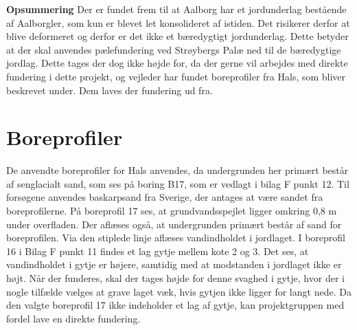 \newline
\newline
\textbf{Opsummering}
\newline
Der er fundet frem til at Aalborg har et jordunderlag bestående af Aalborgler, som kun er blevet let konsolideret af istiden. Det risikerer derfor at  blive deformeret og derfor er det ikke et bæredygtigt jordunderlag. Dette betyder at der skal anvendes pælefundering ved Strøybergs Palæ ned til de bæredygtige jordlag. Dette tages der dog ikke højde for, da der gerne vil arbejdes med direkte fundering i dette projekt, og vejleder har fundet boreprofiler fra Hals, som bliver beskrevet under. Dem laves der fundering ud fra. 


\section{Boreprofiler} 
De anvendte boreprofiler for Hals anvendes, da undergrunden her primært består af senglacialt sand, som ses på boring B17, som er vedlagt i bilag F punkt 12. Til forsøgene anvendes baskarpsand fra Sverige, der antages at være sandet fra boreprofilerne. 
\newline \indent{     }  På boreprofil 17 ses, at grundvandsspejlet ligger omkring 0,8 m under overfladen. Der aflæses også, at undergrunden primært består af sand for boreprofilen. Via den stiplede linje aflæses vandindholdet i jordlaget. 
\newline \indent{     }  I boreprofil 16 i Bilag F punkt 11 findes et lag gytje mellem kote 2 og 3. Det ses, at vandindholdet i gytje er højere, samtidig med at modstanden i jordlaget ikke er højt. Når der funderes, skal der tages højde for denne svaghed i gytje, hvor der i nogle tilfælde vælges at grave laget væk, hvis gytjen ikke ligger for langt nede. Da den valgte boreprofil 17 ikke indeholder et lag af gytje, kan projektgruppen med fordel lave en direkte fundering.